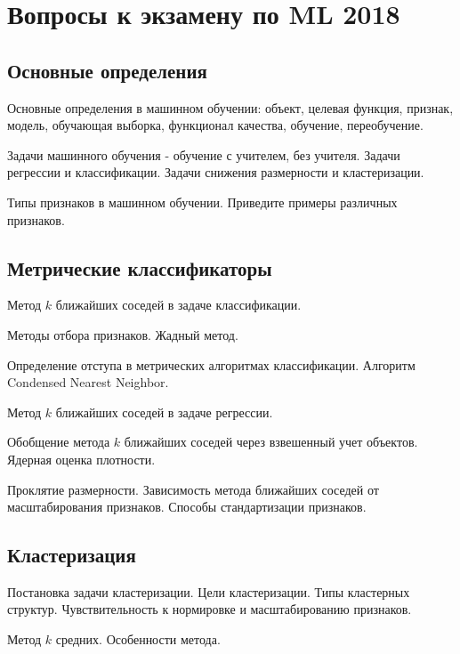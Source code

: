 \documentclass[a4paper,12pt]{article}
\begin{document}
  \section*{Вопросы к экзамену по ML 2018}
  
  \subsection*{Основные определения}  
  
  \myparagraph Основные определения в машинном обучении: объект, целевая функция, признак, модель, обучающая выборка, функционал качества, обучение, переобучение. 

  \myparagraph Задачи машинного обучения - обучение с учителем, без учителя. Задачи регрессии и классификации. Задачи снижения размерности и кластеризации. 

  \myparagraph Типы признаков в машинном обучении. Приведите примеры различных признаков.
  
  \subsection*{Метрические классификаторы}  
  
  \myparagraph Метод $k$ ближайших соседей в задаче классификации. 

  \myparagraph Методы отбора признаков. Жадный метод.  

  \myparagraph Определение отступа в метрических алгоритмах классификации. Алгоритм Condensed Nearest Neighbor. 
  
  \myparagraph Метод $k$ ближайших соседей в задаче регрессии.
  
  \myparagraph Обобщение метода $k$ ближайших соседей через взвешенный учет объектов. Ядерная оценка плотности.
  
  \myparagraph Проклятие размерности. Зависимость метода ближайших соседей от масштабирования признаков. Способы стандартизации признаков.
  
  \subsection*{Кластеризация}  
  
  \myparagraph Постановка задачи кластеризации. Цели кластеризации. Типы кластерных структур. Чувствительность к нормировке и масштабированию признаков.
  
  \myparagraph Метод $k$ средних. Особенности метода. 
  
\end{document}
